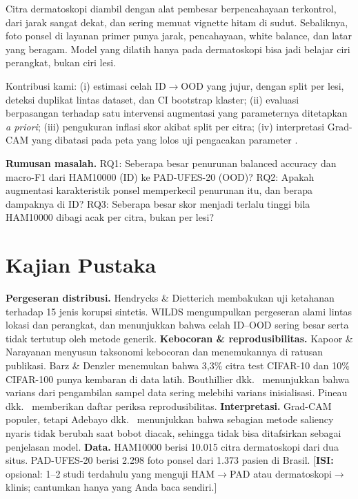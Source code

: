 \documentclass[conference]{IEEEtran}
\newif\ifdraft \drafttrue
\newcommand{\TODO}[1]{\ifdraft{\color{red}[\textbf{ISI:} #1]}\else{\color{red}[TODO BELUM DIISI]}\fi}
\begin{document}
Citra dermatoskopi diambil dengan alat pembesar berpencahayaan terkontrol, dari jarak sangat dekat, dan sering memuat vignette hitam di sudut. Sebaliknya, foto ponsel di layanan primer punya jarak, pencahayaan, white balance, dan latar yang beragam. Model yang dilatih hanya pada dermatoskopi bisa jadi belajar ciri perangkat, bukan ciri lesi.

Kontribusi kami: (i) estimasi celah ID$\rightarrow$OOD yang jujur, dengan split per lesi, deteksi duplikat lintas dataset, dan CI bootstrap klaster; (ii) evaluasi berpasangan terhadap satu intervensi augmentasi yang parameternya ditetapkan \emph{a priori}; (iii) pengukuran inflasi skor akibat split per citra; (iv) interpretasi Grad-CAM yang dibatasi pada peta yang lolos uji pengacakan parameter \cite{adebayo2018sanity}.

\textbf{Rumusan masalah.} RQ1: Seberapa besar penurunan balanced accuracy dan macro-F1 dari HAM10000 (ID) ke PAD-UFES-20 (OOD)? RQ2: Apakah augmentasi karakteristik ponsel memperkecil penurunan itu, dan berapa dampaknya di ID? RQ3: Seberapa besar skor menjadi terlalu tinggi bila HAM10000 dibagi acak per citra, bukan per lesi?

\section{Kajian Pustaka}
\textbf{Pergeseran distribusi.} Hendrycks \& Dietterich \cite{hendrycks2019benchmarking} membakukan uji ketahanan terhadap 15 jenis korupsi sintetis. WILDS \cite{koh2021wilds} mengumpulkan pergeseran alami lintas lokasi dan perangkat, dan menunjukkan bahwa celah ID--OOD sering besar serta tidak tertutup oleh metode generik.
\textbf{Kebocoran \& reprodusibilitas.} Kapoor \& Narayanan \cite{kapoor2023leakage} menyusun taksonomi kebocoran dan menemukannya di ratusan publikasi. Barz \& Denzler \cite{barz2020cifair} menemukan bahwa 3,3\% citra test CIFAR-10 dan 10\% CIFAR-100 punya kembaran di data latih. Bouthillier dkk.\ \cite{bouthillier2021variance} menunjukkan bahwa varians dari pengambilan sampel data sering melebihi varians inisialisasi. Pineau dkk.\ \cite{pineau2021reproducibility} memberikan daftar periksa reprodusibilitas.
\textbf{Interpretasi.} Grad-CAM \cite{selvaraju2017gradcam} populer, tetapi Adebayo dkk.\ \cite{adebayo2018sanity} menunjukkan bahwa sebagian metode saliency nyaris tidak berubah saat bobot diacak, sehingga tidak bisa ditafsirkan sebagai penjelasan model.
\textbf{Data.} HAM10000 \cite{tschandl2018ham} berisi 10.015 citra dermatoskopi dari dua situs. PAD-UFES-20 \cite{pacheco2020pad} berisi 2.298 foto ponsel dari 1.373 pasien di Brasil. \TODO{opsional: 1--2 studi terdahulu yang menguji HAM$\rightarrow$PAD atau dermatoskopi$\rightarrow$klinis; cantumkan hanya yang Anda baca sendiri.}
\end{document}
